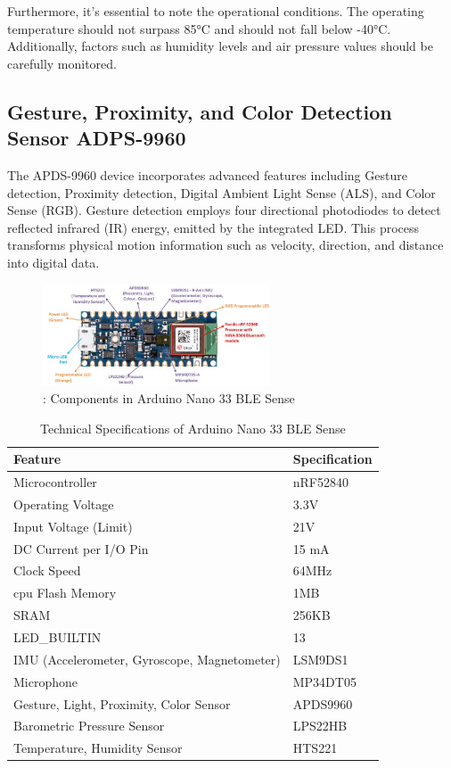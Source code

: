Furthermore, it's essential to note the operational conditions. The operating temperature should not surpass 85°C and should not fall below -40°C. Additionally, factors such as humidity levels and air pressure values should be carefully monitored.

\subsection{ Gesture, Proximity, and Color Detection Sensor ADPS-9960
}

The APDS-9960 device incorporates advanced features including Gesture detection, Proximity detection, Digital Ambient Light Sense (ALS), and Color Sense (RGB). Gesture detection employs four directional photodiodes to detect reflected infrared (IR) energy, emitted by the integrated LED. This process transforms physical motion information such as velocity, direction, and distance into digital data.\cite{Arduino:2023}

\begin{figure}[h!]
	\centering
	\includegraphics[width=0.6\textwidth]{Images/hardware/Arduino-Nano-33-BLE-Sense-Hardware-Overview}
	\caption{: Components in Arduino Nano 33 BLE Sense } \label{fig:Arduino}
\end{figure}

\begin{table}[ht]
	\centering
	\caption{Technical Specifications of Arduino Nano 33 BLE Sense}
	\begin{tabular}{|l|l|}
		\hline
		\textbf{Feature} & \textbf{Specification} \\
		\hline
		Microcontroller & nRF52840 \\
		Operating Voltage & 3.3V \\
		Input Voltage (Limit) & 21V \\
		DC Current per I/O Pin & 15 mA \\
		Clock Speed & 64MHz \\
		\ac{cpu} Flash Memory & 1MB \\
		SRAM & 256KB \\
		LED\_BUILTIN & 13 \\
		IMU (Accelerometer, Gyroscope, Magnetometer) & LSM9DS1 \\
		Microphone & MP34DT05 \\
		Gesture, Light, Proximity, Color Sensor & APDS9960 \\
		Barometric Pressure Sensor & LPS22HB \\
		Temperature, Humidity Sensor & HTS221 \\
		\hline
	\end{tabular}
	\label{tab:tech_specs}
\end{table}


